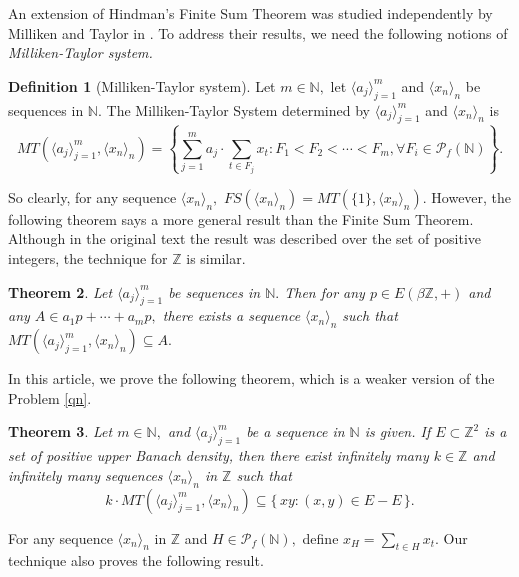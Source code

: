\documentclass{article}
\theoremstyle{Theorem}
\newtheorem{thm}{Theorem}[section]
\theoremstyle{definition}
\newtheorem{defn}[thm]{Definition}
\newcommand{\N}{\mathbb{N}}
\newcommand{\Z}{\mathbb{Z}}
\begin{document}
An extension of Hindman's Finite Sum Theorem was studied independently by Milliken and Taylor in \cite{m,t}. To address their results, we need the following notions of {\it Milliken-Taylor system.} 

\begin{defn}[Milliken-Taylor system]\label{defmillikentaylor}
    Let $m\in \N,$ let $\langle a_j\rangle_{j=1}^m$ and $\langle x_n\rangle_{n}$ be sequences in $\N.$ The
Milliken-Taylor System determined by $\langle a_j\rangle_{j=1}^m$ and $\langle x_n\rangle_{n}$ is 
$$MT\left(\langle a_j \rangle_{j=1}^m, \langle x_n\rangle_{n}\right)=\left\lbrace \sum_{j=1}^m a_j \cdot \sum_{t\in F_j}x_t:F_1<F_2<\cdots <F_m , \forall F_i\in \mathcal{P}_{f}\left(\mathbb{N}\right)\right\rbrace.$$
\end{defn}

So clearly, for any sequence $\langle x_n\rangle_{n},$ $FS(\langle x_n\rangle_{n})=MT\left(\{1\}, \langle x_n\rangle_{n}\right).$ However, the following theorem says a more general result than the Finite Sum Theorem. Although in the original text the result was described over the set of positive integers, the technique for $\Z$ is similar.

\begin{thm}\label{mt}\cite[Theorem 17.31]{book}
    Let $\langle a_j\rangle_{j=1}^m$ be sequences in $\N.$ Then for any $p\in E(\beta \Z,+)$ and any $A\in a_1p+\cdots +a_mp,$ there exists a sequence $\langle x_n\rangle_{n}$ such that $MT\left(\langle a_j \rangle_{j=1}^m, \langle x_n\rangle_{n}\right)\subseteq A.$
\end{thm}










In this article, we prove the following theorem, which is a weaker version of the Problem \ref{qn}.

\begin{thm}\label{new1}
  Let $m\in \N,$ and $\langle a_j\rangle_{j=1}^m$ be a sequence in $\N$ is  given. If  \(E \subset \mathbb{Z}^2\) is a set of positive upper Banach density, then there exist infinitely many $k\in \Z$ and infinitely many sequences $\langle x_n\rangle_n$ in $\Z$ such that 
  \[
k\cdot MT\left(\langle a_j \rangle_{j=1}^m, \langle x_n\rangle_{n}\right) \subseteq \{\, xy : (x,y) \in E - E \,\}.
\]
\end{thm}


For any sequence $\langle x_n\rangle_n$ in $\Z$ and $H\in \mathcal{P}_{f}\left(\mathbb{N}\right),$ define $x_H=\sum_{t\in H}x_t.$ Our technique also proves the following result. 
\end{document}

